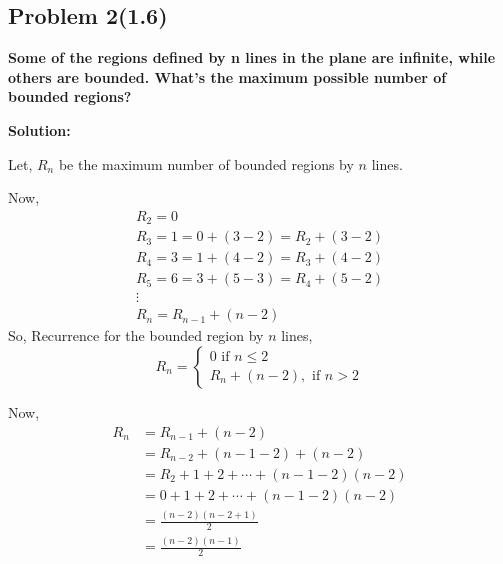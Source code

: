 \subsection{Problem 2(1.6)}
\textbf{Some of the regions defined by n lines in the plane are infinite, while
others are bounded. What's the maximum possible number of bounded
regions?}
\par

\begin{flushleft}
\textbf{Solution:}
\par

Let, $R_n$ be the maximum number of bounded regions by $n$ lines.

Now,
$$
\begin{array}{l}
R_2=0 \\
R_3=1=0+(3-2)=R_2+(3-2) \\
R_4=3=1+(4-2)=R_3+(4-2) \\
R_5=6=3+(5-3)=R_4+(5-2) \\
\vdots \\
R_n=R_{n-1}+(n-2)
\end{array}
$$
So, Recurrence for the bounded region by $n$ lines,
$$
R_n=\left\{\begin{array}{l}
0 \text { if } n \leq 2 \\
R_n+(n-2), \text { if } n>2
\end{array}\right.
$$

Now,
$$
\begin{aligned}
R_n & =R_{n-1}+(n-2) \\
& =R_{n-2}+(n-1-2)+(n-2) \\
& =R_2+1+2+\cdots+(n-1-2)(n-2) \\
& =0+1+2+\cdots+(n-1-2)(n-2) \\
& =\frac{(n-2)(n-2+1)}{2} \\
& =\frac{(n-2)(n-1)}{2}
\end{aligned}
$$
\end{flushleft}
